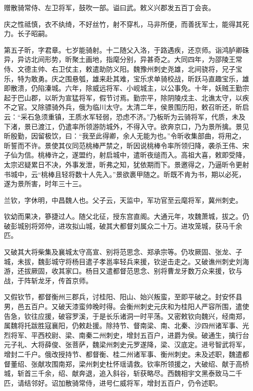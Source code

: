 \documentclass[12pt,UTF8]{ctexbook}
\begin{document}
赠散骑常侍、左卫将军，鼓吹一部。谥曰武。敕义兴郡发五百丁会丧。

庆之性祗慎，衣不纨绮，不好丝竹，射不穿札，马非所便，而善抚军士，能得其死力。长子昭嗣。

第五子昕，字君章。七岁能骑射。十二随父入洛，于路遇疾，还京师。诣鸿胪卿硃异，异访北间形势，昕聚土画地，指麾分别，异甚奇之。大同四年，为邵陵王常侍、文德主帅、右卫仗主，敕遣助防义阳。魏豫州刺史尧雄，北间骁将，兄子宝乐，特为敢勇。庆之围悬瓠，雄来赴其难，宝乐求单骑校战，昕跃马直趣宝乐，雄即散溃，仍陷溱城。六年，除威远将军、小岘城主，以公事免。十年，妖贼王勤宗起于巴山郡，以昕为宣猛将军，假节讨焉。勤宗平，除阴陵戍主、北谯太守，以疾不之官。又除骠骑外兵，俄为临川太守。太清二年，侯景围历阳，敕召昕还，昕启云：“采石急须重镇，王质水军轻弱，恐虑不济。”乃板昕为云骑将军，代质，未及下渚，景已渡江，仍遣率所领游防城外，不得入守。欲奔京口，乃为景所擒。景见昕殷勤，因留极饮，曰：“我至此得卿，余人无能为也。”令昕收集部曲，将用之，昕誓而不许。景使其仪同范桃棒严禁之，昕因说桃棒令率所领归降，袭杀王伟、宋子仙为信。桃棒许之，遂盟约，射启城中，遣昕夜缒而入。高祖大喜，敕即受降，太宗迟疑累日不决，外事发泄，昕弗之知，犹依期而下。景邀得之，乃逼昕令更射书城中，云“桃棒且轻将数十人先入。”景欲裹甲随之。昕既不肯为书，期以必死，遂为景所害，时年三十三。

兰钦，字休明，中昌魏人也。父子云，天监中，军功官至云麾将军，冀州刺史。

钦幼而果决，篸捷过人。随父北征，授东宫直阁。大通元年，攻魏萧城，拔之。仍破彭城别将郊仲，进攻拟山城，破其大都督刘属众二十万。进攻笼城，获马千余匹。

又破其大将柴集及襄城太守高宣、别将范思念、郑承宗等。仍攻厥固、张龙、子城，未拔，魏彭城守将杨目遣子孝邕率轻兵来援，钦逆击走之。又破谯州刺史刘海游，还拔厥固，收其家口。杨目又遣都督范思念、别将曹龙牙数万众来援，钦与战，于阵斩龙牙，传首京师。

又假钦节，都督衡州三郡兵，讨桂阳、阳山、始兴叛蛮，至即平破之。封安怀县男，邑五百户。又破天漆蛮帅晚时得。会衡州刺史元庆和为桂阳人严容所围，遣使告急，钦往应援，破容罗溪，于是长乐诸洞一时平荡。又密敕钦向魏兴，经南郑，属魏将托跋胜寇襄阳，仍敕赴援。除持节、督南梁、南、北秦、沙四州诸军事、光烈将军、平西校尉、梁、南秦二州刺史，增封五百户，进爵为侯。破通生，擒行台元子礼、大将薛俊、张菩萨，魏梁州刺史元罗遂降，梁、汉底定。进号智武将军，增封二千户。俄改授持节、都督衡、桂二州诸军事、衡州刺史。未及述职，魏遣都督董绍、张献攻围南郑，梁州刺史杜怀瑶请救。钦率所领援之，大破绍、献于高桥城，斩首三千余，绍、献奔退，追入斜谷，斩获略尽。西魏相宇文黑泰致马二千匹，请结邻好。诏加散骑常侍，进号仁威将军，增封五百户，仍令述职。
\end{document}
